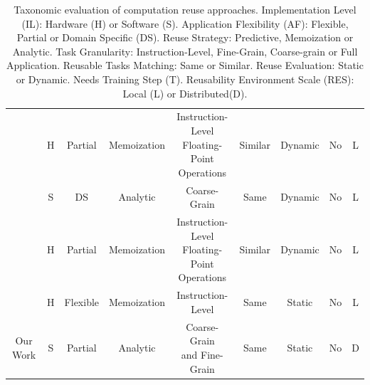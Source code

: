 \begin{table}[t!]
\begin{center}
\begin{scriptsize}
\begin{tabular}{ccccccccc}
\cite{reuse11}       & H            & Partial & Memoization         & \makecell{Instruction-Level \\ Floating-Point \\ Operations}     & Similar             & Dynamic          & No             & L   \\
\cite{reuse12}       & S            & DS                    & Analytic            & Coarse-Grain                          & Same       & Dynamic          & No             & L         \\
\cite{reuse13}       & H            & Partial       & Memoization         & \makecell{Instruction-Level \\ Floating-Point \\ Operations}     & Similar             & Dynamic          & No             & L                 \\
\cite{reuse14}       & H            & Flexible                   & Memoization         & Instruction-Level                                & Same       & Static          & No             & L  \\
\midrule

Our Work       & S            & Partial                & Analytic            & \makecell{Coarse-Grain \\ and Fine-Grain}        & Same       & Static           & No             & D \\

\bottomrule

\end{tabular}
\end{scriptsize}
\caption{Taxonomic evaluation of computation reuse approaches. Implementation Level (IL): Hardware (H) or Software (S). Application Flexibility (AF): Flexible, Partial or Domain Specific (DS). Reuse Strategy: Predictive, Memoization or Analytic. Task Granularity: Instruction-Level, Fine-Grain, Coarse-grain or Full Application. Reusable Tasks Matching: Same or Similar. Reuse Evaluation: Static or Dynamic. Needs Training Step (T). Reusability Environment Scale (RES): Local (L) or Distributed(D).\label{tab:tax}}
\end{center}
\vspace{-4mm}
\end{table}


